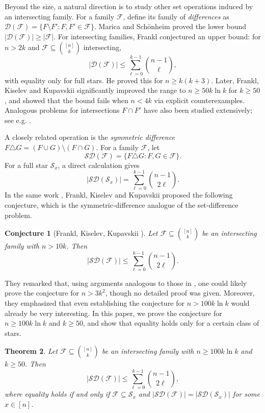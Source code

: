 \documentclass[11pt]{article}
\numberwithin{equation}{section}
\newtheorem{theorem}{Theorem}[section]
\newtheorem{conjecture}[theorem]{Conjecture}
\begin{document}
Beyond the size, a natural direction is to study other set operations induced by an intersecting family. 
For a family $\mathcal{F}$, define its family of \textit{differences} as 
$\mathcal{D}(\mathcal{F})=\{F\setminus F':F,F'\in\mathcal{F}\}$. 
Marica and Sch\"onheim \cite{M69} proved the lower bound $|\mathcal{D}(\mathcal{F})|\ge|\mathcal{F}|$. 
For intersecting families, Frankl \cite{F21} conjectured an upper bound: for $n>2k$ and 
$\mathcal{F}\subseteq\binom{[n]}{k}$ intersecting,
$$
|\mathcal{D}(\mathcal{F})|\le\sum_{\ell=0}^{k-1}\binom{n-1}{\ell},
$$
with equality only for full stars. He proved this for $n\ge k(k+3)$. 
Later, Frankl, Kiselev and Kupavskii \cite{F23} significantly improved the range to 
$n\ge 50k\ln k$ for $k\ge 50$, and showed that the bound fails when $n<4k$ via explicit counterexamples.
Analogous problems for intersections $F \cap F'$ have also been studied extensively; see e.g. \cite{FKK21, FW23}.

A closely related operation is the \textit{symmetric difference} 
$F\triangle G=(F\cup G)\setminus(F\cap G)$. For a family $\mathcal{F}$, let
$$
\mathcal{SD}(\mathcal{F})=\{F\triangle G:F,G\in\mathcal{F}\}.
$$
For a full star $\mathcal{S}_x$, a direct calculation gives
$$
|\mathcal{SD}(\mathcal{S}_x)|=\sum_{\ell=0}^{k-1}\binom{n-1}{2\ell}.
$$
In the same work \cite{F23}, Frankl, Kiselev and Kupavskii proposed the following conjecture, 
which is the symmetric-difference analogue of the set-difference problem.

\begin{conjecture}[Frankl, Kiselev, Kupavskii \cite{F23}]
Let $\mathcal{F}\subseteq\binom{[n]}{k}$ be an intersecting family with $n>10k$. Then
$$
|\mathcal{SD}(\mathcal{F})|\le\sum_{\ell=0}^{k-1}\binom{n-1}{2\ell}. 
$$
\end{conjecture}

They remarked that, using arguments analogous to those in \cite{F21}, one could likely prove the conjecture for $n>3k^2$, though no detailed proof was given. Moreover, they emphasized that even establishing the conjecture 
for $n>100k\ln k$ would already be very interesting.
In this paper, we prove the conjecture for $n\ge 100k\ln k$ and $k\ge 50$, 
and show that equality holds only for  a certain class of  stars.

\begin{theorem}\label{M1}
Let $\mathcal{F}\subseteq\binom{[n]}{k}$ be an intersecting family with  $n\ge 100 k\ln k$ and $k\ge 50$. Then
$$
|\mathcal{SD}(\mathcal{F})|\le\sum_{\ell=0}^{k-1}\binom{n-1}{2\ell}, 
$$
where equality holds if and only if $\mathcal{F}\subseteq \mathcal{S}_x$ and $|\mathcal{SD}(\mathcal{F})|=|\mathcal{SD}(\mathcal{S}_x)|$ for some $x\in [n]$.
\end{theorem}
\end{document}
